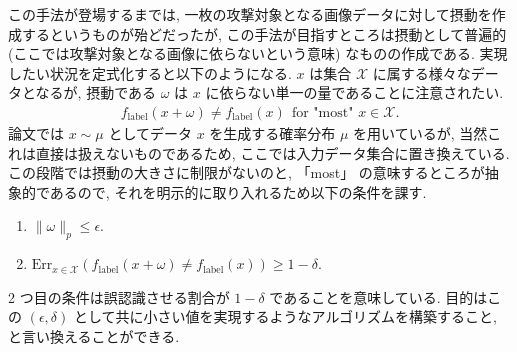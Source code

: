 この手法が登場するまでは, 一枚の攻撃対象となる画像データに対して摂動を作成するというものが殆どだったが, この手法が目指すところは摂動として普遍的 (ここでは攻撃対象となる画像に依らないという意味) なものの作成である.
実現したい状況を定式化すると以下のようになる.
$x$ は集合 $\mathcal{X}$ に属する様々なデータとなるが, 摂動である $\omega$ は $x$ に依らない単一の量であることに注意されたい.
%
\begin{eqnarray}
f_{\text{label}} (x + \omega) \neq f_{\text{label}} (x) \ \ \text{for "most" } x \in \mathcal{X}.
\label{eq:universal-adversarial-formulation}
\end{eqnarray}
%
論文では $x \sim  \mu$ としてデータ $x$ を生成する確率分布 $\mu$ を用いているが, 当然これは直接は扱えないものであるため, ここでは入力データ集合に置き換えている.
この段階では摂動の大きさに制限がないのと, 「most」 の意味するところが抽象的であるので, それを明示的に取り入れるため以下の条件を課す.
%
\begin{enumerate}
  \item $\|\omega\|_{p} \leq \epsilon.$
  \item $\text{Err}_{x \in \mathcal{X}} \left( f_{\text{label}} (x + \omega) \neq f_{\text{label}} (x)  \right) \geq 1 - \delta.$
\end{enumerate}
%
2 つ目の条件は誤認識させる割合が $1 - \delta$ であることを意味している.
目的はこの $(\epsilon, \delta)$ として共に小さい値を実現するようなアルゴリズムを構築すること, と言い換えることができる.

